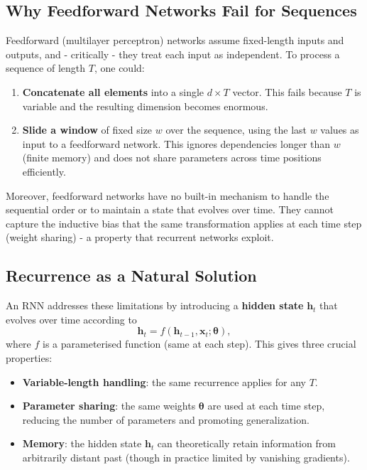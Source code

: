 \documentclass{tufte-handout}
\begin{document}
\subsection{Why Feedforward Networks Fail for Sequences}

Feedforward (multilayer perceptron) networks assume fixed-length inputs and outputs, and - critically - they treat each input as independent. To process a sequence of length $T$, one could:
\begin{enumerate}
    \item \textbf{Concatenate all elements} into a single $d \times T$ vector. This fails because $T$ is variable and the resulting dimension becomes enormous.
    \item \textbf{Slide a window} of fixed size $w$ over the sequence, using the last $w$ values as input to a feedforward network. This ignores dependencies longer than $w$ (finite memory) and does not share parameters across time positions efficiently.
\end{enumerate}

Moreover, feedforward networks have no built-in mechanism to handle the sequential order or to maintain a state that evolves over time. They cannot capture the inductive bias that the same transformation applies at each time step (weight sharing) - a property that recurrent networks exploit.

\subsection{Recurrence as a Natural Solution}

An RNN addresses these limitations by introducing a \textbf{hidden state} $\mathbf{h}_t$ that evolves over time according to
\[
\mathbf{h}_t = f(\mathbf{h}_{t-1}, \mathbf{x}_t; \boldsymbol{\theta}),
\]
where $f$ is a parameterised function (same at each step). This gives three crucial properties:
\begin{itemize}
    \item \textbf{Variable-length handling}: the same recurrence applies for any $T$.
    \item \textbf{Parameter sharing}: the same weights $\boldsymbol{\theta}$ are used at each time step, reducing the number of parameters and promoting generalization.
    \item \textbf{Memory}: the hidden state $\mathbf{h}_t$ can theoretically retain information from arbitrarily distant past (though in practice limited by vanishing gradients).
\end{itemize}
\end{document}
